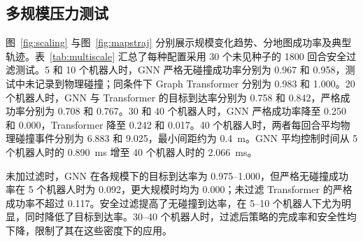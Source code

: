 \documentclass[conference]{IEEEtran}
\begin{document}
\subsection{多规模压力测试}
图~\ref{fig:scaling} 与图~\ref{fig:mapstraj} 分别展示规模变化趋势、分地图成功率及典型轨迹。表~\ref{tab:multiscale} 汇总了每种配置采用 30 个未见种子的 1800 回合安全过滤测试。5 和 10 个机器人时，GNN 严格无碰撞成功率分别为 0.967 和 0.958，测试中未记录到物理碰撞；同条件下 Graph Transformer 分别为 0.983 和 1.000。20 个机器人时，GNN 与 Transformer 的目标到达率分别为 0.758 和 0.842，严格成功率分别为 0.708 和 0.767。30 和 40 个机器人时，GNN 严格成功率降至 0.250 和 0.000，Transformer 降至 0.242 和 0.017。40 个机器人时，两者每回合平均物理碰撞事件分别为 6.883 和 9.025，最小间距约为 0.4~m。GNN 平均控制时间从 5 个机器人时的 0.890~ms 增至 40 个机器人时的 2.066~ms。

未加过滤时，GNN 在各规模下的目标到达率为 0.975--1.000，但严格无碰撞成功率在 5 个机器人时为 0.092，更大规模时均为 0.000；未过滤 Transformer 的严格成功率不超过 0.117。安全过滤提高了无碰撞到达率，在 5--10 个机器人下尤为明显，同时降低了目标到达率。30--40 个机器人时，过滤后策略的完成率和安全性均下降，限制了其在这些密度下的应用。

\begin{table}[t]
\caption{安全过滤下的多规模测试（30 个未见种子，1800 个回合，四类地图聚合，按机器人数量索引）。严格成功率要求到达目标且不发生物理碰撞。}
\label{tab:multiscale}
\centering
\footnotesize
\setlength{\tabcolsep}{4pt}
\end{table}
\end{document}
